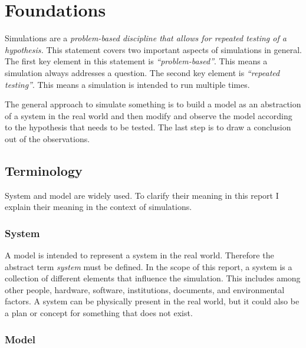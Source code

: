 
\section{Foundations}


Simulations are a \textit{problem-based discipline that allows for repeated testing of a hypothesis.} \cite{sokolowski2010modelingintro} This statement covers two important aspects of simulations in general. The first key element in this statement is \textit{“problem-based”}. This means a simulation always addresses a question. The second key element is \textit{“repeated testing”}. This means a simulation is intended to run multiple times.

The general approach to simulate something is to build a model as an abstraction of a system in the real world and then modify and observe the model according to the hypothesis that needs to be tested. The last step is to draw a conclusion out of the observations.

\subsection{Terminology}

System and model are widely used. To clarify their meaning in this report I explain their meaning in the context of simulations.

\subsubsection{System}

A model is intended to represent a system in the real world. Therefore the abstract term \textit{system} must be defined. In the scope of this report, a system is a collection of different elements that influence the simulation. This includes among other people, hardware, software, institutions, documents, and environmental factors. A system can be physically present in the real world, but it could also be a plan or concept for something that does not exist.


\subsubsection{Model}

